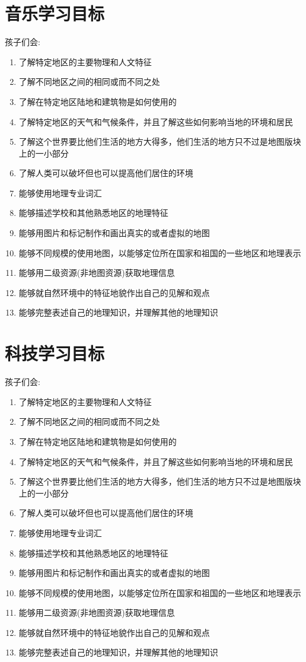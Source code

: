 \section{音乐学习目标}
   孩子们会:
   \begin{enumerate}
     \item  了解特定地区的主要物理和人文特征
     \item  了解不同地区之间的相同或而不同之处
     \item  了解在特定地区陆地和建筑物是如何使用的
     \item  了解特定地区的天气和气候条件，并且了解这些如何影响当地的环境和居民
     \item  了解这个世界要比他们生活的地方大得多，他们生活的地方只不过是地图版块上的一小部分
     \item  了解人类可以破坏但也可以提高他们居住的环境
     \item  能够使用地理专业词汇
     \item  能够描述学校和其他熟悉地区的地理特征
     \item  能够用图片和标记制作和画出真实的或者虚拟的地图
     \item  能够不同规模的使用地图，以能够定位所在国家和祖国的一些地区和地理表示
     \item  能够用二级资源(非地图资源)获取地理信息
     \item  能够就自然环境中的特征地貌作出自己的见解和观点
     \item  能够完整表述自己的地理知识，并理解其他的地理知识

   \end{enumerate}


\section{科技学习目标}
   孩子们会:
   \begin{enumerate}
     \item  了解特定地区的主要物理和人文特征
     \item  了解不同地区之间的相同或而不同之处
     \item  了解在特定地区陆地和建筑物是如何使用的
     \item  了解特定地区的天气和气候条件，并且了解这些如何影响当地的环境和居民
     \item  了解这个世界要比他们生活的地方大得多，他们生活的地方只不过是地图版块上的一小部分
     \item  了解人类可以破坏但也可以提高他们居住的环境
     \item  能够使用地理专业词汇
     \item  能够描述学校和其他熟悉地区的地理特征
     \item  能够用图片和标记制作和画出真实的或者虚拟的地图
     \item  能够不同规模的使用地图，以能够定位所在国家和祖国的一些地区和地理表示
     \item  能够用二级资源(非地图资源)获取地理信息
     \item  能够就自然环境中的特征地貌作出自己的见解和观点
     \item  能够完整表述自己的地理知识，并理解其他的地理知识

   \end{enumerate}


